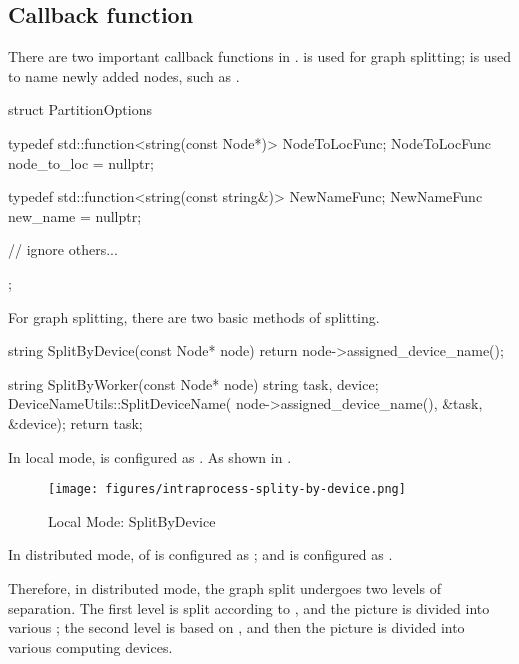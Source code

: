 \subsection{Callback function}
There are two important callback functions in .  is used for graph splitting;  is used to name newly added nodes, such as .

\begin{leftbar}
\begin{c++}
struct PartitionOptions {
  typedef std::function<string(const Node*)> NodeToLocFunc;
  NodeToLocFunc node_to_loc = nullptr;

  typedef std::function<string(const string&)> NewNameFunc;
  NewNameFunc new_name = nullptr;

  // ignore others...
};
\end{c++}
\end{leftbar}

For graph splitting, there are two basic methods of splitting.

\begin{leftbar}
\begin{c++}
string SplitByDevice(const Node* node) {
  return node->assigned_device_name();
}

string SplitByWorker(const Node* node) {
  string task, device;
  DeviceNameUtils::SplitDeviceName(
      node->assigned_device_name(), &task, &device);
  return task;
}
\end{c++}
\end{leftbar}

In local mode,  is configured as . As shown in .

\begin{figure}[H]
  \centering
  \texttt{[image: figures/intraprocess-splity-by-device.png]}
  \caption{Local Mode: SplitByDevice}
  \label{fig:intraprocess-splity-by-device}
\end{figure}


In distributed mode,  of  is configured as ; and 
 is configured as .

Therefore, in distributed mode, the graph split undergoes two levels of separation. The first level is split according to , and the picture is divided into various ; the second level is based on , and then the picture is divided into various computing devices.


